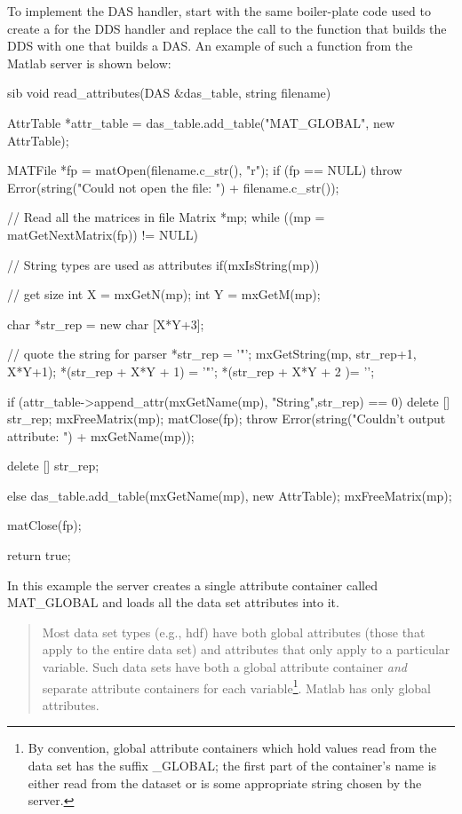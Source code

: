 \documentclass{dods-paper}
\begin{document}
To implement the DAS handler, start with the same boiler-plate code
used to create a  for the DDS handler and replace the call
to the function that builds the DDS with one that builds a DAS. An
example of such a function from the Matlab server is shown below:

\begin{vcode}{sib}
void
read_attributes(DAS &das_table, string filename)
{
    AttrTable *attr_table = das_table.add_table("MAT_GLOBAL", new AttrTable);
    
    MATFile *fp = matOpen(filename.c_str(), "r");
    if (fp == NULL)
        throw Error(string("Could not open the file: ") + filename.c_str());

    // Read all the matrices in file
    Matrix *mp;
    while ((mp = matGetNextMatrix(fp)) != NULL) {
        // String types are used as attributes
        if(mxIsString(mp)) {
            // get size
            int X = mxGetN(mp);
            int Y = mxGetM(mp);

            char *str_rep = new char [X*Y+3];
      
            // quote the string for parser
            *str_rep = '"'; 
            mxGetString(mp, str_rep+1, X*Y+1);
            *(str_rep + X*Y + 1) = '"';
            *(str_rep + X*Y + 2 )= '\0';

            if (attr_table->append_attr(mxGetName(mp),
                "String",str_rep) == 0) {
                delete [] str_rep;
                mxFreeMatrix(mp);
                matClose(fp);
                throw Error(string("Couldn't output attribute: ")
                            + mxGetName(mp));
            }

            delete [] str_rep;
        }
        else {
            das_table.add_table(mxGetName(mp), new AttrTable);
        }
        mxFreeMatrix(mp);
    }
    matClose(fp);

    return true;
}
\end{vcode}
  
In this example the server creates a single attribute container called
MAT\_GLOBAL and loads all the data set attributes into it.

\begin{quote}
  
  Most data set types (e.g., hdf) have both global attributes (those that
  apply to the entire data set) and attributes that only apply to
  a particular variable. Such data sets have both a global attribute container
  \emph{and} separate attribute containers for each variable\footnote{By
    convention, global attribute containers which hold values read from the
    data set has the suffix \_GLOBAL; the first part of the container's name
    is either read from the dataset or is some appropriate string chosen by
    the server.}. Matlab has only global attributes.

\end{quote}
\end{document}
